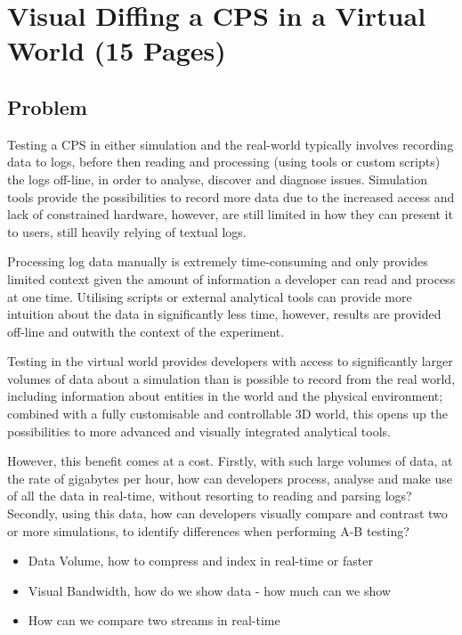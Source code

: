 \chapter{Visual Diffing a CPS in a Virtual World (15 Pages)}

\section{Problem}
\label{sec:Problem}
Testing a CPS in either simulation and the real-world typically involves recording data to logs, before then reading and processing (using tools or custom scripts) the logs off-line, in order to analyse, discover and diagnose issues. Simulation tools provide the possibilities to record more data due to the increased access and lack of constrained hardware, however, are still limited in how they can present it to users, still heavily relying of textual logs.

Processing log data manually is extremely time-consuming and only provides limited context given the amount of information a developer can read and process at one time. Utilising scripts or external analytical tools can provide more intuition about the data in significantly less time, however, results are provided off-line and outwith the context of the experiment.

Testing in the virtual world provides developers with access to significantly larger volumes of data about a simulation than is possible to record from the real world, including information about entities in the world and the physical environment; combined with a fully customisable and controllable 3D world, this opens up the possibilities to more advanced and visually integrated analytical tools. 

However, this benefit comes at a cost. Firstly, with such large volumes of data, at the rate of gigabytes per hour, how can developers process, analyse and make use of all the data in real-time, without resorting to reading and parsing logs? Secondly, using this data, how can developers visually compare and contrast two or more simulations, to identify differences when performing A-B testing?

\begin{itemize}
  \item Data Volume, how to compress and index in real-time or faster
  \item Visual Bandwidth, how do we show data - how much can we show
  \item How can we compare two streams in real-time
\end{itemize}

